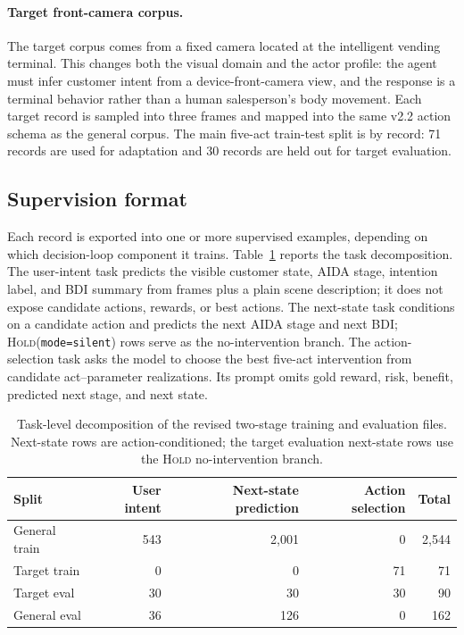\paragraph{Target front-camera corpus.}
The target corpus comes from a fixed camera located at the intelligent vending terminal. This changes both the visual domain and the actor profile: the agent must infer customer intent from a device-front-camera view, and the response is a terminal behavior rather than a human salesperson's body movement. Each target record is sampled into three frames and mapped into the same v2.2 action schema as the general corpus. The main five-act train-test split is by record: 71 records are used for adaptation and 30 records are held out for target evaluation.

\subsection{Supervision format}

Each record is exported into one or more supervised examples, depending on which decision-loop component it trains. Table~\ref{tab:task-counts} reports the task decomposition. The user-intent task predicts the visible customer state, AIDA stage, intention label, and BDI summary from frames plus a plain scene description; it does not expose candidate actions, rewards, or best actions. The next-state task conditions on a candidate action and predicts the next AIDA stage and next BDI; \textsc{Hold}(\texttt{mode=silent}) rows serve as the no-intervention branch. The action-selection task asks the model to choose the best five-act intervention from candidate act--parameter realizations. Its prompt omits gold reward, risk, benefit, predicted next stage, and next state.

\begin{table}[t]
\centering
\small
\begin{tabular}{lrrrr}
\toprule
Split & User intent & Next-state prediction & Action selection & Total \\
\midrule
General train & 543 & 2,001 & 0 & 2,544 \\
Target train & 0 & 0 & 71 & 71 \\
Target eval & 30 & 30 & 30 & 90 \\
General eval & 36 & 126 & 0 & 162 \\
\bottomrule
\end{tabular}
\caption{Task-level decomposition of the revised two-stage training and evaluation files. Next-state rows are action-conditioned; the target evaluation next-state rows use the \textsc{Hold} no-intervention branch.}
\label{tab:task-counts}
\end{table}

